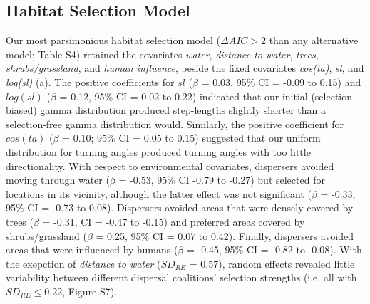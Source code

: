 \documentclass[abstract=on,10pt,a4paper,bibliography=totocnumbered]{article}
\begin{document}
\subsection{Habitat Selection Model}
Our most parsimonious habitat selection model (\(\Delta AIC > 2\) than any
alternative model; Table S4) retained the covariates \textit{water},
\textit{distance to water}, \textit{trees}, \textit{shrubs/grassland}, and
\textit{human influence}, beside the fixed covariates \textit{cos(ta)},
\textit{sl}, and \textit{log(sl)} (a). The positive
coefficients for \(sl\) (\(\beta\) = 0.03, 95\% CI = -0.09 to 0.15) and
\(log(sl)\) (\(\beta\) = 0.12, 95\% CI = 0.02 to 0.22) indicated that our
initial (selection-biased) gamma distribution produced step-lengths slightly
shorter than a selection-free gamma distribution would. Similarly, the positive
coefficient for \(cos(ta)\) (\(\beta\) = 0.10; 95\% CI = 0.05 to 0.15) suggested
that our uniform distribution for turning angles produced turning angles with
too little directionality.  With respect to environmental covariates, dispersers avoided
moving through water (\(\beta\) = -0.53, 95\% CI -0.79 to -0.27) but selected
for locations in its vicinity, although the latter effect was not significant
(\(\beta\) = -0.33, 95\% CI = -0.73 to 0.08). Dispersers avoided areas that were
densely covered by trees (\(\beta\) = -0.31, CI = -0.47 to -0.15) and preferred
areas covered by shrubs/grassland (\(\beta\) = 0.25, 95\% CI = 0.07 to 0.42).
Finally, dispersers avoided areas that were influenced by humans (\(\beta\) =
-0.45, 95\% CI = -0.82 to -0.08). With the exepction of \textit{distance to
water} (\(SD_{RE}\) = 0.57), random effects revealed little variability between
different dispersal coalitions' selection strengths (i.e. all with \(SD_{RE}
\leq 0.22\), Figure S7).
\end{document}
